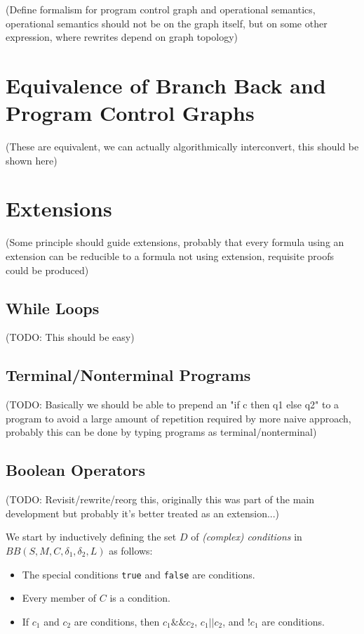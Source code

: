 \documentclass[11pt]{article}
\begin{document}
(Define formalism for program control graph and operational semantics, operational semantics should not be on the graph itself, but on some other expression, where rewrites depend on graph topology)

\section{Equivalence of Branch Back and Program Control Graphs}

(These are equivalent, we can actually algorithmically interconvert, this should be shown here)

\section{Extensions}

(Some principle should guide extensions, probably that every formula using an extension can be reducible to a formula not using extension, requisite proofs could be produced)

\subsection{While Loops}

(TODO: This should be easy)

\subsection{Terminal/Nonterminal Programs}

(TODO: Basically we should be able to prepend an "if c then q1 else q2" to a program to avoid a large amount of repetition required by more naive approach, probably this can be done by typing programs as terminal/nonterminal)

\subsection{Boolean Operators}

(TODO: Revisit/rewrite/reorg this, originally this was part of the main development but probably it's better treated as an extension...)

We start by inductively defining the set $D$ of \emph{(complex) conditions} in $BB(S, M, C, \delta_{1}, \delta_{2}, L)$ as follows:

\begin{itemize}
\item The special conditions \texttt{true} and \texttt{false} are conditions.
\item Every member of $C$ is a condition.
\item If $c_{1}$ and $c_{2}$ are conditions, then $c_{1} \texttt{\&\&} c_{2}$, $c_{1} \texttt{||} c_{2}$, and $\texttt{!} c_{1}$ are conditions.
\end{itemize}
\end{document}
